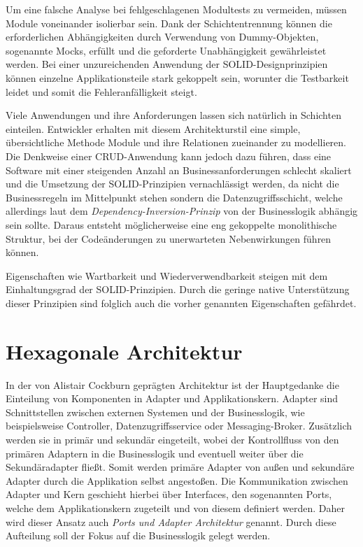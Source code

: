 \documentclass[conference]{IEEEtran}
\begin{document}
Um eine falsche Analyse bei fehlgeschlagenen Modultests zu vermeiden, müssen Module voneinander isolierbar sein. Dank der Schichtentrennung können die erforderlichen Abhängigkeiten durch Verwendung von Dummy-Objekten, sogenannte Mocks, erfüllt und die geforderte Unabhängigkeit gewährleistet werden. Bei einer unzureichenden Anwendung der SOLID-Designprinzipien können einzelne Applikationsteile stark gekoppelt sein, worunter die Testbarkeit leidet und somit die Fehleranfälligkeit steigt.

Viele Anwendungen und ihre Anforderungen lassen sich natürlich in Schichten einteilen. Entwickler erhalten mit diesem Architekturstil eine simple, übersichtliche Methode Module und ihre Relationen zueinander zu modellieren. Die Denkweise einer CRUD-Anwendung kann jedoch dazu führen, dass eine Software mit einer steigenden Anzahl an Businessanforderungen schlecht skaliert und die Umsetzung der SOLID-Prinzipien vernachlässigt werden, da nicht die Businessregeln im Mittelpunkt stehen sondern die Datenzugriffsschicht, welche allerdings laut dem \emph{Dependency-Inversion-Prinzip} von der Businesslogik abhängig sein sollte. Daraus entsteht möglicherweise eine eng gekoppelte monolithische Struktur, bei der Codeänderungen zu unerwarteten Nebenwirkungen führen können. \cite{layer.solid}

Eigenschaften wie Wartbarkeit und Wiederverwendbarkeit steigen mit dem Einhaltungsgrad der SOLID-Prinzipien. Durch die geringe native Unterstützung dieser Prinzipien sind folglich auch die vorher genannten Eigenschaften gefährdet. 






\section{Hexagonale Architektur} 


In der von Alistair Cockburn geprägten Architektur ist der Hauptgedanke die Einteilung von Komponenten in Adapter und Applikationskern. Adapter sind Schnittstellen zwischen externen Systemen und der Businesslogik, wie beispielsweise Controller, Datenzugriffsservice oder Messaging-Broker. Zusätzlich werden sie in primär und sekundär eingeteilt, wobei der Kontrollfluss von den primären Adaptern in die Businesslogik und eventuell weiter über die Sekundäradapter fließt. Somit werden primäre Adapter von außen und sekundäre Adapter durch die Applikation selbst angestoßen. Die Kommunikation zwischen Adapter und Kern geschieht hierbei über Interfaces, den sogenannten Ports, welche dem Applikationskern zugeteilt und von diesem definiert werden. Daher wird dieser Ansatz auch \emph{Ports und Adapter Architektur} genannt. Durch diese Aufteilung soll der Fokus auf die Businesslogik gelegt werden. \cite{hex} \cite{Martin.2018} 
\end{document}
